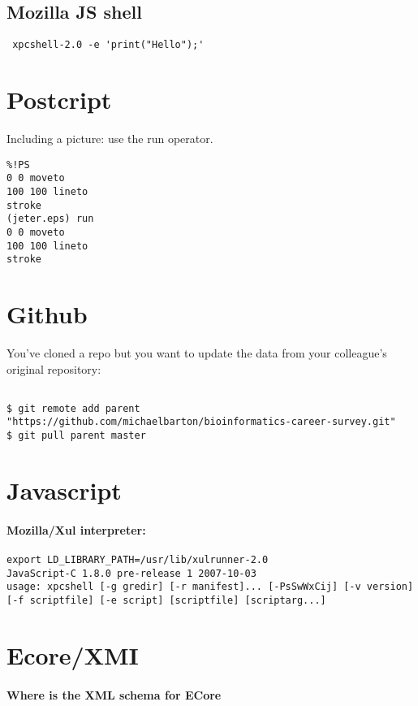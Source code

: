 \documentclass[12pt]{article}
\begin{document}
\subsection{Mozilla JS shell}
\begin{lstlisting}
 xpcshell-2.0 -e 'print("Hello");'
\end{lstlisting}
\section{Postcript}
Including a picture: use the run operator.
\begin{lstlisting}
%!PS
0 0 moveto
100 100 lineto
stroke
(jeter.eps) run
0 0 moveto
100 100 lineto
stroke
\end{lstlisting}
\section{Github}
You've cloned a repo but you want to update the data from your colleague's original repository:
\begin{lstlisting}

$ git remote add parent "https://github.com/michaelbarton/bioinformatics-career-survey.git"
$ git pull parent master
\end{lstlisting}


\section{Javascript}
\paragraph{Mozilla/Xul interpreter:}
\begin{lstlisting}
export LD_LIBRARY_PATH=/usr/lib/xulrunner-2.0
JavaScript-C 1.8.0 pre-release 1 2007-10-03
usage: xpcshell [-g gredir] [-r manifest]... [-PsSwWxCij] [-v version] [-f scriptfile] [-e script] [scriptfile] [scriptarg...]
\end{lstlisting}
\section{Ecore/XMI}
\paragraph{Where is the XML schema for ECore}
\end{document}
